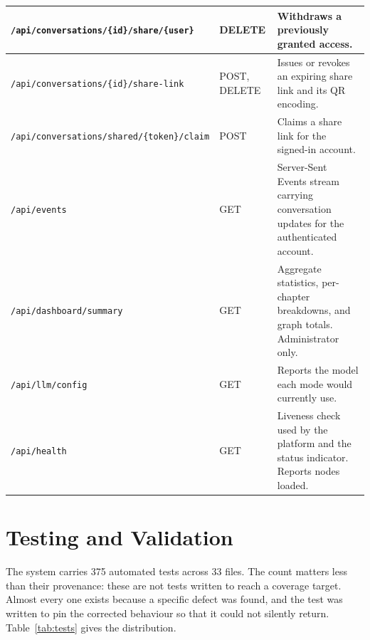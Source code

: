 \begin{longtable}{|p{}|p{}|p{}|}
\texttt{/api/conversations/\{id\}/share/\{user\}} & DELETE & Withdraws a previously granted access. \\ \hline
\texttt{/api/conversations/\{id\}/share-link} & POST, DELETE & Issues or revokes an expiring share link and its QR encoding. \\ \hline
\texttt{/api/conversations/shared/\{token\}/claim} & POST & Claims a share link for the signed-in account. \\ \hline
\texttt{/api/events} & GET & Server-Sent Events stream carrying conversation updates for the authenticated account. \\ \hline
\texttt{/api/dashboard/summary} & GET & Aggregate statistics, per-chapter breakdowns, and graph totals. Administrator only. \\ \hline
\texttt{/api/llm/config} & GET & Reports the model each mode would currently use. \\ \hline
\texttt{/api/health} & GET & Liveness check used by the platform and the status indicator. Reports nodes loaded. \\ \hline
\end{longtable}

\section{Testing and Validation}

The system carries 375 automated tests across 33 files. The count matters less than their
provenance: these are not tests written to reach a coverage target. Almost every one exists
because a specific defect was found, and the test was written to pin the corrected
behaviour so that it could not silently return. Table~\ref{tab:tests} gives the
distribution.

